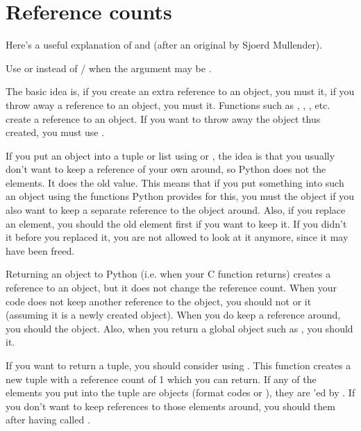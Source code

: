 \section{Reference counts}

Here's a useful explanation of  and 
(after an original by Sjoerd Mullender).

Use  or  instead of  /
 when the argument may be .

The basic idea is, if you create an extra reference to an object, you
must  it, if you throw away a reference to an object,
you must  it.  Functions such as
, ,
, etc. create a reference to an object.  If you
want to throw away the object thus created, you must use
.

If you put an object into a tuple or list using 
or , the idea is that you usually don't want to
keep a reference of your own around, so Python does not
 the elements.  It does  the old value.
This means that if you put something into such an object using the
functions Python provides for this, you must  the
object if you also want to keep a separate reference to the object around.
Also, if you replace an element, you should  the old
element first if you want to keep it.  If you didn't 
it before you replaced it, you are not allowed to look at it anymore,
since it may have been freed.

Returning an object to Python (i.e. when your C function returns)
creates a reference to an object, but it does not change the reference
count.  When your code does not keep another reference to the object,
you should not  or  it (assuming it is a
newly created object).  When you do keep a reference around, you
should  the object.  Also, when you return a global
object such as , you should  it.

If you want to return a tuple, you should consider using
.  This function creates a new tuple with a reference
count of 1 which you can return.  If any of the elements you put into
the tuple are objects (format codes  or ), they
are 'ed by .  If you don't want to keep
references to those elements around, you should  them
after having called .

